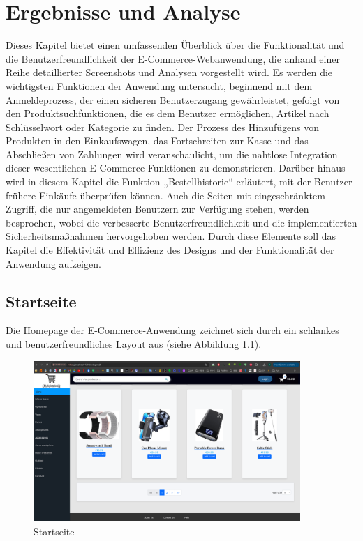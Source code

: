 \chapter{Ergebnisse und Analyse}

Dieses Kapitel bietet einen umfassenden Überblick über die Funktionalität und die Benutzerfreundlichkeit der E-Commerce-Webanwendung, die anhand einer Reihe detaillierter Screenshots und Analysen vorgestellt wird. Es werden die wichtigsten Funktionen der Anwendung untersucht, beginnend mit dem Anmeldeprozess, der einen sicheren Benutzerzugang gewährleistet, gefolgt von den Produktsuchfunktionen, die es dem Benutzer ermöglichen, Artikel nach Schlüsselwort oder Kategorie zu finden. Der Prozess des Hinzufügens von Produkten in den Einkaufswagen, das Fortschreiten zur Kasse und das Abschließen von Zahlungen wird veranschaulicht, um die nahtlose Integration dieser wesentlichen E-Commerce-Funktionen zu demonstrieren. Darüber hinaus wird in diesem Kapitel die Funktion „Bestellhistorie“ erläutert, mit der Benutzer frühere Einkäufe überprüfen können. Auch die Seiten mit eingeschränktem Zugriff, die nur angemeldeten Benutzern zur Verfügung stehen, werden besprochen, wobei die verbesserte Benutzerfreundlichkeit und die implementierten Sicherheitsmaßnahmen hervorgehoben werden. Durch diese Elemente soll das Kapitel die Effektivität und Effizienz des Designs und der Funktionalität der Anwendung aufzeigen.

\section{Startseite}
Die Homepage der E-Commerce-Anwendung zeichnet sich durch ein schlankes und benutzerfreundliches Layout aus (siehe Abbildung \ref{fig:sample-image}).

\begin{figure}[H]  
	\centering %
	\includegraphics[width=0.9\textwidth]{Images/Home-Page.png} 
	\caption{Startseite} 
	\label{fig:sample-image} 
\end{figure}

